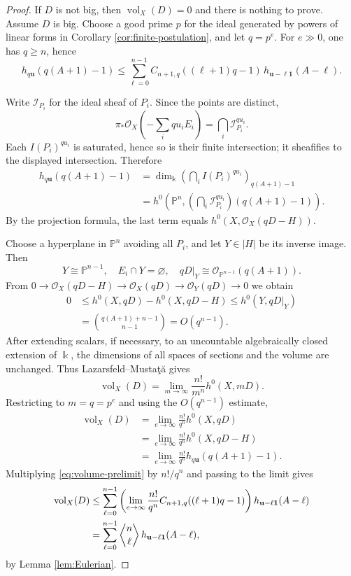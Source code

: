 \documentclass[11pt]{amsart}
\theoremstyle{remark}
\newcommand{\PP}{\mathbb P}
\newcommand{\kk}{\Bbbk}
\newcommand{\vol}{\operatorname{vol}}
\newcommand{\eul}[2]{\genfrac{\langle}{\rangle}{0pt}{}{#1}{#2}}
\begin{document}
\begin{proof}
If $D$ is not big, then $\vol_X(D)=0$ and there is nothing to prove. Assume $D$ is big. Choose a good prime $p$ for the ideal generated by powers of linear forms in Corollary \ref{cor:finite-postulation}, and let $q=p^e$. For $e\gg0$, one has $q\ge n$, hence
\begin{equation}\label{eq:volume-prelimit}
h_{q\mathbf u}(q(A+1)-1)
\le
\sum_{\ell=0}^{n-1}
C_{n+1,q}((\ell+1)q-1)
\,h_{\mathbf u-\ell\mathbf1}(A-\ell).
\end{equation}

Write $\mathcal I_{P_i}$ for the ideal sheaf of $P_i$. Since the points are distinct,
$$
\pi_*\mathcal O_X\left(-\sum_i qu_iE_i\right)
=
\bigcap_i\mathcal I_{P_i}^{qu_i}.
$$
Each $I(P_i)^{qu_i}$ is saturated, hence so is their finite intersection; it sheafifies to the displayed intersection. Therefore
$$
\begin{aligned}
h_{q\mathbf u}(q(A+1)-1)
&=\dim_{\kk}\left(\bigcap_i I(P_i)^{qu_i}\right)_{q(A+1)-1}\\
&=h^0\!\left(\PP^n,
\left(\bigcap_i\mathcal I_{P_i}^{qu_i}\right)(q(A+1)-1)\right).
\end{aligned}
$$
By the projection formula, the last term equals
$
h^0(X,\mathcal O_X(qD-H)).
$

Choose a hyperplane in $\PP^n$ avoiding all $P_i$, and let $Y\in|H|$ be its inverse image. Then
$$
Y\cong\PP^{n-1},
\quad
E_i\cap Y=\varnothing,
\quad
qD|_Y\cong\mathcal O_{\PP^{n-1}}(q(A+1)).
$$
From
$
0\to\mathcal O_X(qD-H)
\to\mathcal O_X(qD)
\to\mathcal O_Y(qD)
\to 0
$
we obtain
$$
\begin{aligned}
0
&\le h^0(X,qD)-h^0(X,qD-H) \le h^0(Y,qD|_Y)\\
&=\binom{q(A+1)+n-1}{n-1} = O(q^{n-1}).
\end{aligned}
$$
After extending scalars, if necessary, to an uncountable algebraically closed extension of $\kk$, the dimensions of all spaces of sections and the volume are unchanged. Thus Lazarsfeld--Musta\c{t}\u{a} \cite[Theorem~A]{LazarsfeldMustata} gives
$$
\vol_X(D)
=
\lim_{m\to\infty}\frac{n!}{m^n}h^0(X,mD).
$$
Restricting to $m=q=p^e$ and using the $O(q^{n-1})$ estimate,
$$
\begin{aligned}
\vol_X(D)
&=
\lim_{e\to\infty}\frac{n!}{q^n}h^0(X,qD)\\
&=
\lim_{e\to\infty}\frac{n!}{q^n}h^0(X,qD-H)\\
&=
\lim_{e\to\infty}\frac{n!}{q^n}h_{q\mathbf u}(q(A+1)-1).
\end{aligned}
$$
Multiplying \eqref{eq:volume-prelimit} by $n!/q^n$ and passing to the limit gives
$$
\begin{aligned}
\vol_X(D)
&\le
\sum_{\ell=0}^{n-1}
\left(
\lim_{e\to\infty}\frac{n!}{q^n}
C_{n+1,q}((\ell+1)q-1)
\right)
 h_{\mathbf u-\ell\mathbf1}(A-\ell)\\
&=
\sum_{\ell=0}^{n-1}
\eul{n}{\ell}\,h_{\mathbf u-\ell\mathbf1}(A-\ell),
\end{aligned}
$$
by Lemma \ref{lem:Eulerian}.
\end{proof}
\end{document}

